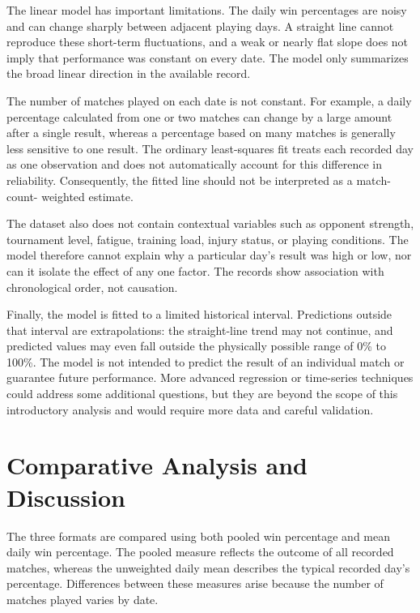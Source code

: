 \documentclass[journal]{IEEEtran}
\numberwithin{equation}{subsection}
\begin{document}
The linear model has important limitations. The daily win
percentages are noisy and can change sharply between adjacent
playing days. A straight line cannot reproduce these short-term
fluctuations, and a weak or nearly flat slope does not imply
that performance was constant on every date. The model only
summarizes the broad linear direction in the available record.

The number of matches played on each date is not constant.
For example, a daily percentage calculated from one or two
matches can change by a large amount after a single result,
whereas a percentage based on many matches is generally less
sensitive to one result. The ordinary least-squares fit treats
each recorded day as one observation and does not automatically
account for this difference in reliability. Consequently,
the fitted line should not be interpreted as a match-count-
weighted estimate.

The dataset also does not contain contextual variables such
as opponent strength, tournament level, fatigue, training load,
injury status, or playing conditions. The model therefore
cannot explain why a particular day's result was high or low,
nor can it isolate the effect of any one factor. The records
show association with chronological order, not causation.

Finally, the model is fitted to a limited historical interval.
Predictions outside that interval are extrapolations: the
straight-line trend may not continue, and predicted values may
even fall outside the physically possible range of 0\% to
100\%. The model is not intended to predict the result of an
individual match or guarantee future performance. More
advanced regression or time-series techniques could address
some additional questions, but they are beyond the scope of
this introductory analysis and would require more data and
careful validation.

\section{Comparative Analysis and Discussion}

The three formats are compared using both pooled win
percentage and mean daily win percentage. The pooled measure
reflects the outcome of all recorded matches, whereas the
unweighted daily mean describes the typical recorded day's
percentage. Differences between these measures arise because
the number of matches played varies by date.
\end{document}
